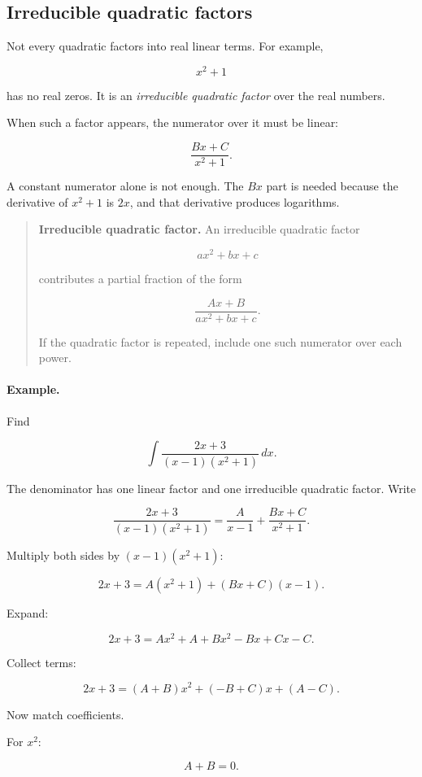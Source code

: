 \subsection{Irreducible quadratic factors}
\label{subsec:irreducible-quadratic-factors}

Not every quadratic factors into real linear terms.  For example,

\[
x^2+1
\]

has no real zeros.  It is an \emph{irreducible quadratic factor} over the real numbers.

When such a factor appears, the numerator over it must be linear:

\[
\frac{Bx+C}{x^2+1}.
\]

A constant numerator alone is not enough.  The \(Bx\) part is needed because the
derivative of \(x^2+1\) is \(2x\), and that derivative produces logarithms.

\begin{quote}
\textbf{Irreducible quadratic factor.}
An irreducible quadratic factor

\[
ax^2+bx+c
\]

contributes a partial fraction of the form

\[
\frac{Ax+B}{ax^2+bx+c}.
\]

If the quadratic factor is repeated, include one such numerator over each power.
\end{quote}

\paragraph{Example.}
Find

\[
\int \frac{2x+3}{(x-1)(x^2+1)}\,dx.
\]

The denominator has one linear factor and one irreducible quadratic factor.  Write

\[
\frac{2x+3}{(x-1)(x^2+1)}
=
\frac{A}{x-1}
+
\frac{Bx+C}{x^2+1}.
\]

Multiply both sides by \((x-1)(x^2+1)\):

\[
2x+3=A(x^2+1)+(Bx+C)(x-1).
\]

Expand:

\[
2x+3
=
Ax^2+A+Bx^2-Bx+Cx-C.
\]

Collect terms:

\[
2x+3
=
(A+B)x^2+(-B+C)x+(A-C).
\]

Now match coefficients.

For \(x^2\):

\[
A+B=0.
\]

